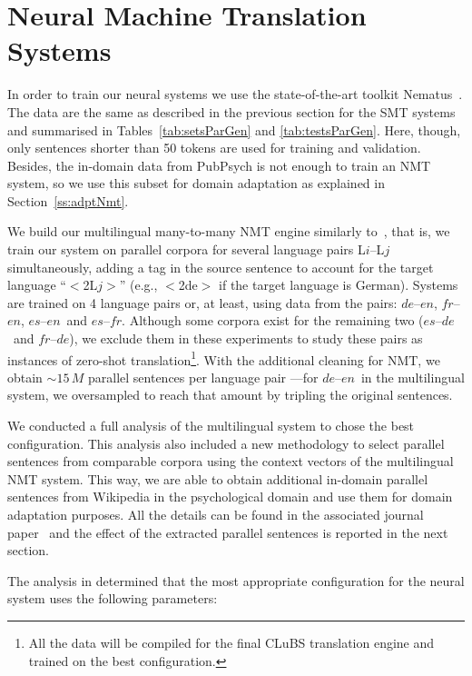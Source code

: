 \documentclass[a4paper,11pt]{article}
\newcommand{\en}{$en$}
\newcommand{\es}{$es$}
\newcommand{\fr}{$fr$}
\newcommand{\de}{$de$}
\begin{document}
\section{Neural Machine Translation Systems}
\label{s:nmt}

In order to train our neural systems we use the state-of-the-art toolkit Nematus~\cite{nematus}. The data are the same as described in the previous section for the SMT systems and summarised in Tables~\ref{tab:setsParGen} and \ref{tab:testsParGen}. Here, though, only sentences shorter than 50 tokens are used for training and validation. Besides, the in-domain data from PubPsych is not enough to train an NMT system, so we use this subset for domain adaptation as explained in Section~\ref{ss:adptNmt}. 

We build our multilingual many-to-many NMT engine similarly to~\cite{johnsonEtal:2016}, that is, we train our system on parallel corpora for several language pairs L$i$--L$j$ simultaneously, adding a tag in the source sentence to account for the target language ``$<$2L$j>$'' (e.g., $<$2de$>$ if the target language is German).
Systems are trained on 4 language pairs or, at least, using data from the pairs: \de--\en, \fr--\en, \es--\en\ and \es--\fr. Although some corpora exist for the remaining two (\es--\de\ and \fr--\de), we exclude them in these experiments to study these pairs as instances of zero-shot translation\footnote{All the data will be compiled for the final CLuBS translation engine and trained on the best configuration.}.
With the additional cleaning for NMT, we obtain $\sim$$15\,M$ parallel sentences per language pair ---for \de--\en\ in the multilingual system, we oversampled to reach that amount by tripling the original sentences.

We conducted a full analysis of the multilingual system to chose the best configuration. This analysis also included a new methodology to select parallel sentences from comparable corpora using the context vectors of the multilingual NMT system. This way, we are able to obtain additional in-domain parallel sentences from Wikipedia in the psychological domain and use them for domain adaptation purposes. All the details can be found in the associated journal paper~\cite{espanaEtAl:2017} and the effect of the extracted parallel sentences is reported in the next section. 

The analysis in \cite{espanaEtAl:2017} determined that the most appropriate configuration for the neural system uses the following parameters:
\end{document}

